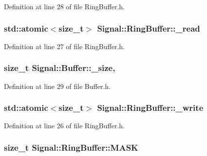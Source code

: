 Definition at line 28 of file Ring\+Buffer.\+h.

\hypertarget{class_signal_1_1_ring_buffer_a4bdf5d626567f423b480398aef2e8bb0}{
\subsubsection[{\+\_\+read}]{\setlength{\rightskip}{0pt plus 5cm}std\+::atomic$<$size\+\_\+t$>$ Signal\+::\+Ring\+Buffer\+::\+\_\+read\hspace{0.3cm}{\ttfamily [protected]}}}\label{class_signal_1_1_ring_buffer_a4bdf5d626567f423b480398aef2e8bb0}


Definition at line 27 of file Ring\+Buffer.\+h.

\hypertarget{class_signal_1_1_buffer_ab4c8969e972323306ee51538ad70577b}{
\subsubsection[{\+\_\+size}]{\setlength{\rightskip}{0pt plus 5cm}size\+\_\+t Signal\+::\+Buffer\+::\+\_\+size\hspace{0.3cm}{\ttfamily [protected]}, {\ttfamily [inherited]}}}\label{class_signal_1_1_buffer_ab4c8969e972323306ee51538ad70577b}


Definition at line 29 of file Buffer.\+h.

\hypertarget{class_signal_1_1_ring_buffer_a121cbb3679c61132fad237c671d08bef}{
\subsubsection[{\+\_\+write}]{\setlength{\rightskip}{0pt plus 5cm}std\+::atomic$<$size\+\_\+t$>$ Signal\+::\+Ring\+Buffer\+::\+\_\+write\hspace{0.3cm}{\ttfamily [protected]}}}\label{class_signal_1_1_ring_buffer_a121cbb3679c61132fad237c671d08bef}


Definition at line 26 of file Ring\+Buffer.\+h.

\hypertarget{class_signal_1_1_ring_buffer_a6f0dc159e6d625b8352988c6a0577ffe}{
\subsubsection[{M\+A\+S\+K}]{\setlength{\rightskip}{0pt plus 5cm}size\+\_\+t Signal\+::\+Ring\+Buffer\+::\+M\+A\+S\+K\hspace{0.3cm}{\ttfamily [protected]}}}\label{class_signal_1_1_ring_buffer_a6f0dc159e6d625b8352988c6a0577ffe}


